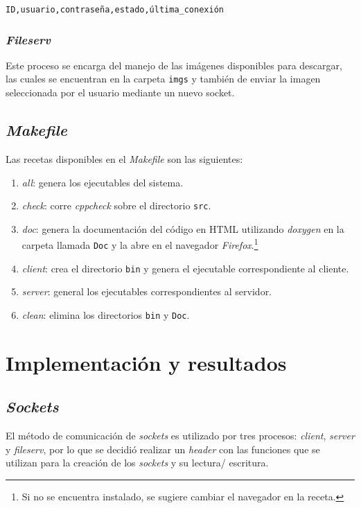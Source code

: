 \documentclass[12pt,a4paper]{article}
\begin{document}
\begin{center}
  \verb|ID,usuario,contraseña,estado,última_conexión|
\end{center}


\subsubsection{\emph{Fileserv}}
\label{files_ps}
Este proceso se encarga del manejo de las imágenes disponibles
para descargar, las cuales se encuentran en la carpeta \verb|imgs|
y también de enviar la imagen seleccionada por el usuario mediante
un nuevo socket.

\subsection{\emph{Makefile}}
\label{make}
Las recetas disponibles en el \emph{Makefile} son las siguientes:

\begin{enumerate}
  \item \emph{all}: genera los ejecutables del sistema.
  \item \emph{check}: corre \emph{cppcheck} sobre el directorio
  \verb|src|.
  \item \emph{doc}: genera la documentación del código en HTML
  utilizando \emph{doxygen} en la carpeta llamada \verb|Doc| y la
  abre en el navegador  \emph{Firefox}.\footnote{Si no se encuentra
  instalado, se sugiere cambiar el navegador en la receta.}
  \item \emph{client}: crea el directorio \verb|bin| y genera el
  ejecutable correspondiente al cliente.
  \item \emph{server}: general los ejecutables correspondientes al
  servidor.
  \item \emph{clean}: elimina los directorios \verb|bin| y
  \verb|Doc|.
\end{enumerate}


\section{Implementación y resultados}
\label{resultados}

\subsection{\emph{Sockets}}
El método de comunicación de \emph{sockets} es utilizado por tres
procesos: \emph{client}, \emph{server} y \emph{fileserv}, por lo
que se decidió realizar un \emph{header} con las funciones que se
utilizan para la creación de los \emph{sockets} y su lectura/
escritura.
\end{document}

